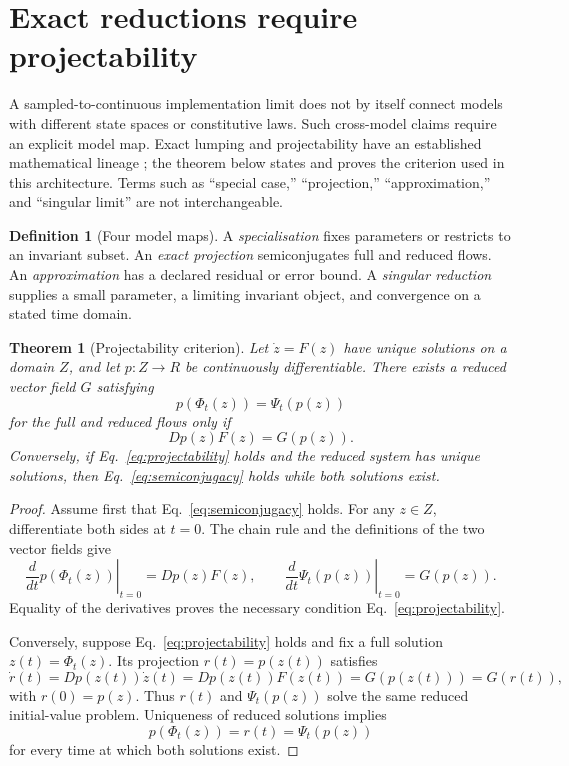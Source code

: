 \documentclass[11pt]{article}
\newtheorem{theorem}{Theorem}
\theoremstyle{definition}
\newtheorem{definition}{Definition}
\begin{document}
\section{Exact reductions require projectability}

A sampled-to-continuous implementation limit does not by itself connect models with different state spaces or constitutive laws. Such cross-model claims require an explicit model map. Exact lumping and projectability have an established mathematical lineage \cite{li1989,horstmeyer2016}; the theorem below states and proves the criterion used in this architecture. Terms such as ``special case,'' ``projection,'' ``approximation,'' and ``singular limit'' are not interchangeable.

\begin{definition}[Four model maps]
A \emph{specialisation} fixes parameters or restricts to an invariant subset. An \emph{exact projection} semiconjugates full and reduced flows. An \emph{approximation} has a declared residual or error bound. A \emph{singular reduction} supplies a small parameter, a limiting invariant object, and convergence on a stated time domain.
\end{definition}

\begin{theorem}[Projectability criterion]
\label{thm:projectability}
Let $\dot z=F(z)$ have unique solutions on a domain $Z$, and let $p:Z\to R$ be continuously differentiable. There exists a reduced vector field $G$ satisfying
\begin{equation}
p(\Phi_t(z))=\Psi_t(p(z))
\label{eq:semiconjugacy}
\end{equation}
for the full and reduced flows only if
\begin{equation}
Dp(z)F(z)=G(p(z)).
\label{eq:projectability}
\end{equation}
Conversely, if Eq.~\eqref{eq:projectability} holds and the reduced system has unique solutions, then Eq.~\eqref{eq:semiconjugacy} holds while both solutions exist.
\end{theorem}

\begin{proof}
Assume first that Eq.~\eqref{eq:semiconjugacy} holds. For any $z\in Z$, differentiate both sides at $t=0$. The chain rule and the definitions of the two vector fields give
\[
\left.\frac{d}{dt}p(\Phi_t(z))\right|_{t=0}=Dp(z)F(z),
\qquad
\left.\frac{d}{dt}\Psi_t(p(z))\right|_{t=0}=G(p(z)).
\]
Equality of the derivatives proves the necessary condition Eq.~\eqref{eq:projectability}.

Conversely, suppose Eq.~\eqref{eq:projectability} holds and fix a full solution $z(t)=\Phi_t(z)$. Its projection $r(t)=p(z(t))$ satisfies
\[
\dot r(t)=Dp(z(t))\dot z(t)
=Dp(z(t))F(z(t))
=G(p(z(t)))=G(r(t)),
\]
with $r(0)=p(z)$. Thus $r(t)$ and $\Psi_t(p(z))$ solve the same reduced initial-value problem. Uniqueness of reduced solutions implies
\[
p(\Phi_t(z))=r(t)=\Psi_t(p(z))
\]
for every time at which both solutions exist.
\end{proof}
\end{document}

